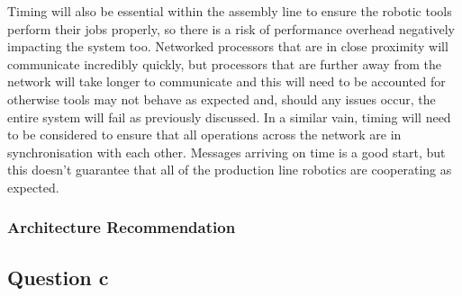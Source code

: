 \documentclass[]{report}
\begin{document}
				Timing will also be essential within the assembly line to ensure the robotic tools perform their jobs properly, so there is a risk of performance overhead negatively impacting the system too. Networked processors that are in close proximity will communicate incredibly quickly, but processors that are further away from the network will take longer to communicate and this will need to be accounted for otherwise tools may not behave as expected and, should any issues occur, the entire system will fail as previously discussed. In a similar vain, timing will need to be considered to ensure that all operations across the network are in synchronisation with each other. Messages arriving on time is a good start, but this doesn't guarantee that all of the production line robotics are cooperating as expected.
				
				\subsubsection{Architecture Recommendation}
				
				
			
			
			\subsection{Question c}


	
	
\end{document}
